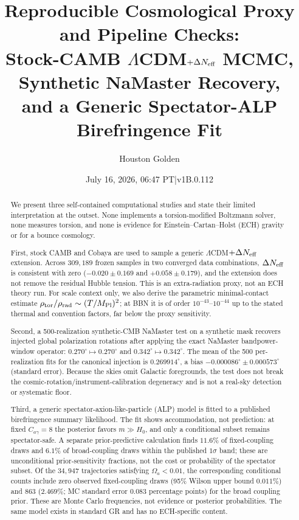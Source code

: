 \documentclass[aps,prd,twocolumn,superscriptaddress,showpacs,preprintnumbers,nofootinbib,longbibliography,floatfix]{revtex4-2}
\newcommand{\paperVersion}{v1B.0.112}
\newcommand{\paperTimestamp}{July 16, 2026, 06:47 PT}
\begin{document}

\title{Reproducible Cosmological Proxy and Pipeline Checks:\\
Stock-CAMB $\Lambda$CDM$+\Delta N_{\rm eff}$ MCMC, Synthetic NaMaster Recovery,\\
and a Generic Spectator-ALP Birefringence Fit}

\author{Houston Golden}

\date{\paperTimestamp\enspace|\enspace\paperVersion}

\begin{abstract}
We present three self-contained computational studies and state their limited
interpretation at the outset.  None implements a torsion-modified Boltzmann
solver, none measures torsion, and none is evidence for
Einstein--Cartan--Holst (ECH) gravity or for a bounce cosmology.

First, stock CAMB and Cobaya are used to sample a generic
$\Lambda$CDM$+\Delta N_{\rm eff}$ extension.  Across $309{,}189$ frozen samples
in two converged data combinations, $\Delta N_{\rm eff}$ is consistent with
zero ($-0.020\pm0.169$ and $+0.058\pm0.179$), and the extension does not remove
the residual Hubble tension.  This is an extra-radiation proxy, not an ECH
theory run.  For scale context only, we also derive the parametric
minimal-contact estimate $\rho_{\rm tor}/\rho_{\rm rad}\sim(T/M_{\rm Pl})^2$;
at BBN it is of order $10^{-43}$--$10^{-44}$ up to the stated thermal and
convention factors, far below the proxy sensitivity.

Second, a 500-realization synthetic-CMB NaMaster test on a synthetic mask
recovers injected global polarization rotations after applying the exact
NaMaster bandpower-window operator: $0.270^\circ\mapsto0.270^\circ$ and
$0.342^\circ\mapsto0.342^\circ$. The mean of the 500 per-realization fits for
the canonical injection is $0.269914^\circ$, a bias
$-0.000086^\circ\pm0.000573^\circ$ (standard error). Because the skies omit Galactic foregrounds,
the test does not break the cosmic-rotation/instrument-calibration degeneracy
and is not a real-sky detection or systematic floor.

Third, a generic spectator-axion-like-particle (ALP) model is fitted to a
published birefringence summary likelihood.  The fit shows accommodation, not
prediction: at fixed $C_{a\gamma}=8$ the posterior favors $m\gg H_0$, and only
a conditional subset remains spectator-safe.  A separate prior-predictive calculation
finds $11.6\%$ of fixed-coupling draws and $6.1\%$ of broad-coupling draws
within the published $1\sigma$ band; these are unconditional prior-sensitivity
fractions, not the cost or probability of the spectator subset. Of the
$34{,}947$ trajectories satisfying $\Omega_a<0.01$, the corresponding
conditional counts include zero observed fixed-coupling draws (95\% Wilson upper bound
$0.011\%$) and $863$ ($2.469\%$; MC standard error $0.083$ percentage
points) for the broad
coupling prior. These are Monte Carlo frequencies, not evidence or posterior
probabilities. The
same model exists in standard GR and has no ECH-specific content.


\end{abstract}
\end{document}
